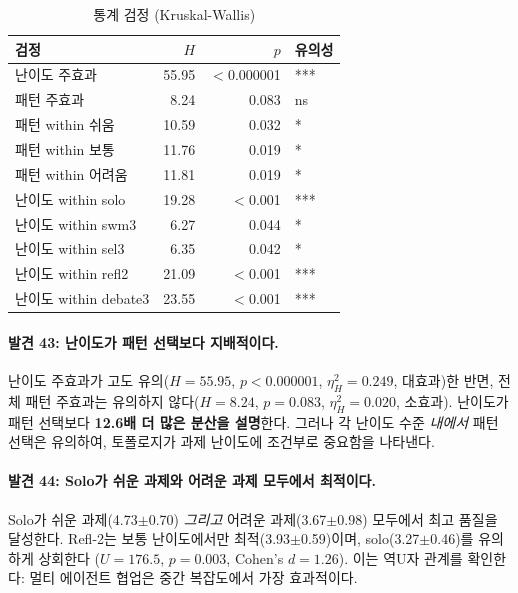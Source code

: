 \begin{table}[H]
\centering
\caption{통계 검정 (Kruskal-Wallis)}
\label{tab:kw-difficulty}
{\small
\begin{tabular}{lrrl}
\toprule
검정 & $H$ & $p$ & 유의성 \\
\midrule
난이도 주효과             & 55.95 & $<$0.000001 & *** \\
패턴 주효과               & 8.24  & 0.083       & ns \\
패턴 within 쉬움          & 10.59 & 0.032       & * \\
패턴 within 보통          & 11.76 & 0.019       & * \\
패턴 within 어려움        & 11.81 & 0.019       & * \\
난이도 within solo        & 19.28 & $<$0.001    & *** \\
난이도 within swm3        & 6.27  & 0.044       & * \\
난이도 within sel3        & 6.35  & 0.042       & * \\
난이도 within refl2       & 21.09 & $<$0.001    & *** \\
난이도 within debate3     & 23.55 & $<$0.001    & *** \\
\bottomrule
\end{tabular}
}
\end{table}

\paragraph{발견 43: 난이도가 패턴 선택보다 지배적이다.}
난이도 주효과가 고도 유의($H=55.95$, $p<0.000001$, $\eta^{2}_{H}=0.249$, 대효과)한 반면, 전체 패턴 주효과는 유의하지 않다($H=8.24$, $p=0.083$, $\eta^{2}_{H}=0.020$, 소효과). 난이도가 패턴 선택보다 \textbf{12.6배 더 많은 분산을 설명}한다. 그러나 각 난이도 수준 \emph{내에서} 패턴 선택은 유의하여, 토폴로지가 과제 난이도에 조건부로 중요함을 나타낸다.

\paragraph{발견 44: Solo가 쉬운 과제와 어려운 과제 모두에서 최적이다.}
Solo가 쉬운 과제(4.73$\pm$0.70) \emph{그리고} 어려운 과제(3.67$\pm$0.98) 모두에서 최고 품질을 달성한다. Refl-2는 보통 난이도에서만 최적(3.93$\pm$0.59)이며, solo(3.27$\pm$0.46)를 유의하게 상회한다 ($U=176.5$, $p=0.003$, Cohen's $d=1.26$). 이는 역U자 관계를 확인한다: 멀티 에이전트 협업은 중간 복잡도에서 가장 효과적이다.

